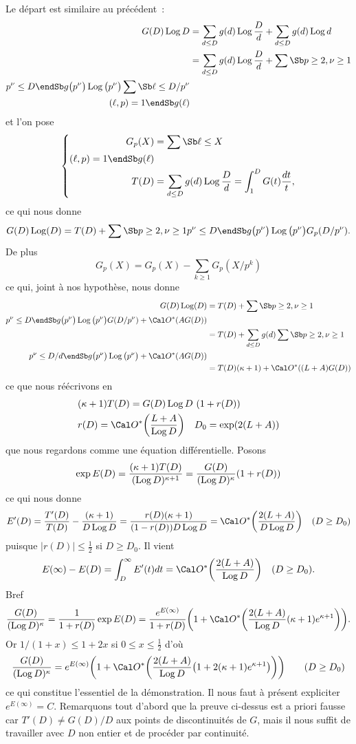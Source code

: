 Le d\'epart est similaire au pr\'ec\'edent~:
$$
\aligned
G(D)\Log D
&=\sum_{d\le D}g(d)\Log\frac{D}{d}+
\sum_{d\le D}g(d)\Log d
\\&=\sum_{d\le D}g(d)\Log\frac{D}{d}+
\sum\Sb p\ge 2,\nu\ge1 \\ p^{\nu}\le D\endSb
g\big(p^{\nu}\big)\Log\big(p^{\nu}\big)
\sum\Sb \ell\le D/p^{\nu}\\ (\ell,p)=1\endSb g(\ell)
\endaligned
$$
et l'on pose
$$
\left\{
\aligned
G_p(X)&=\sum\Sb \ell\le X\\ (\ell,p)=1\endSb g(\ell)
\\T(D)&=\sum_{d\le D}g(d)\Log\frac{D}{d}
=\int_1^D G(t)\frac{dt}{t},
\endaligned\right.
$$
ce qui nous donne
$$
G(D)\Log(D)=T(D)+\sum\Sb p\ge 2,\nu\ge1 \\ p^{\nu}\le D\endSb
g\big(p^{\nu}\big)\Log\big(p^{\nu}\big)G_p(D/p^{\nu}).
$$
De plus
$$
G_p(X)=G_p(X)-\sum_{k\ge1}G_p(X/p^k)
$$
ce qui, joint \`a nos hypoth\`ese, nous donne
$$
\aligned
G(D)\Log(D)
&=T(D)+\sum\Sb p\ge 2,\nu\ge1 \\ p^{\nu}\le D\endSb
g\big(p^{\nu}\big)\Log\big(p^{\nu}\big)G(D/p^{\nu})
+\Cal O^*(A G(D))
\\&=
T(D)+\sum_{d\le D}g(d)\sum\Sb p\ge 2,\nu\ge1 \\ p^{\nu}\le D/d\endSb
g\big(p^{\nu}\big)\Log\big(p^{\nu}\big)
+\Cal O^*(A G(D))
\\&=T(D)(\kappa+1)+\Cal O^*((L+A) G(D))
\endaligned
$$
ce que nous r\'e\'ecrivons en
$$
\aligned
& (\kappa+1)T(D)=G(D)\Log D\ (1+r(D))
\\& r(D)=\Cal O^*\bigg(\frac{L+A}{\Log D}\bigg)\quad D_0=\exp(2(L+A))
\endaligned
$$
que nous regardons comme une \'equation diff\'erentielle. Posons
$$
\exp E(D)
=\frac{(\kappa+1)T(D)}{(\Log D)^{\kappa+1}}
=\frac{G(D)}{(\Log D)^\kappa}(1+r(D))
$$
ce qui nous donne
$$
E'(D)=
\frac{T'(D)}{T(D)}-\frac{(\kappa+1)}{D\Log D}
=\frac{r(D)(\kappa+1)}{(1-r(D))D\Log D}
=\Cal O^*\bigg(\frac{2(L+A)}{D\Log D}\bigg)
\quad(D\ge D_0)
$$
puisque $|r(D)|\le\tfrac12$ si $D\ge D_0$.
Il vient
$$
E(\infty)-E(D)=\int_D^\infty E'(t)dt
=\Cal O^*\bigg(\frac{2(L+A)}{\Log D}\bigg)
\quad(D\ge D_0).
$$
Bref
$$
\frac{G(D)}{(\Log D)^\kappa}=
\frac{1}{1+r(D)}\exp E(D)
=\frac{e^{E(\infty)}}{1+r(D)}\bigg(1+\Cal O^*\bigg(
\frac{2(L+A)}{\Log D}(\kappa+1)e^{\kappa+1}\bigg)\bigg).
$$
Or $1/(1+x)\le 1+2x$ si $0\le x\le\tfrac12$  d'o\`u
$$
\frac{G(D)}{(\Log D)^\kappa}=e^{E(\infty)}
\bigg(1+\Cal O^*\bigg(
\frac{2(L+A)}{\Log D}\big(1+2(\kappa+1)e^{\kappa+1}\big)\bigg)\bigg)
\qquad(D\ge D_0)
$$
ce qui constitue l'essentiel de la d\'emonstration.
Il nous faut \`a pr\'esent expliciter $e^{E(\infty)}=C$.
Remarquons tout d'abord que la preuve ci-dessus est a priori fausse
car $T'(D)\neq G(D)/D$ aux points de discontinuit\'es de $G$, mais
il nous suffit de travailler avec $D$ non entier et de proc\'eder par
continuit\'e.

